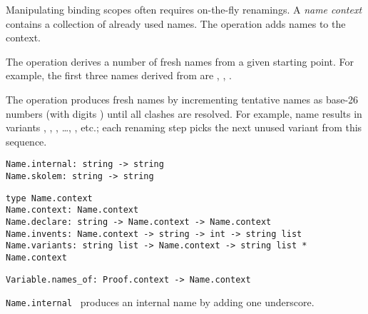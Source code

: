 \begin{isabellebody}
\begin{isamarkuptext}
  \medskip Manipulating binding scopes often requires on-the-fly
  renamings.  A \emph{name context} contains a collection of already
  used names.  The  operation adds names to the
  context.

  The  operation derives a number of fresh names from
  a given starting point.  For example, the first three names derived
  from  are , , .

  The  operation produces fresh names by
  incrementing tentative names as base-26 numbers (with digits ) until all clashes are resolved.  For example, name  results in variants , , , \dots, ,  etc.; each renaming
  step picks the next unused variant from this sequence.%
\end{isamarkuptext}%
\isamarkuptrue%
%
\isadelimmlref
%
\endisadelimmlref
%
\isatagmlref
%
\begin{isamarkuptext}%
\begin{mldecls}
  \verb|Name.internal: string -> string| \\
  \verb|Name.skolem: string -> string| \\
  \end{mldecls}
  \begin{mldecls}
  \verb|type Name.context| \\
  \verb|Name.context: Name.context| \\
  \verb|Name.declare: string -> Name.context -> Name.context| \\
  \verb|Name.invents: Name.context -> string -> int -> string list| \\
  \verb|Name.variants: string list -> Name.context -> string list * Name.context| \\
  \end{mldecls}
  \begin{mldecls}
  \verb|Variable.names_of: Proof.context -> Name.context| \\
  \end{mldecls}

  \begin{description}

  \item \verb|Name.internal|~ produces an internal name
  by adding one underscore.


\end{description}
\end{isamarkuptext}
\end{isabellebody}
